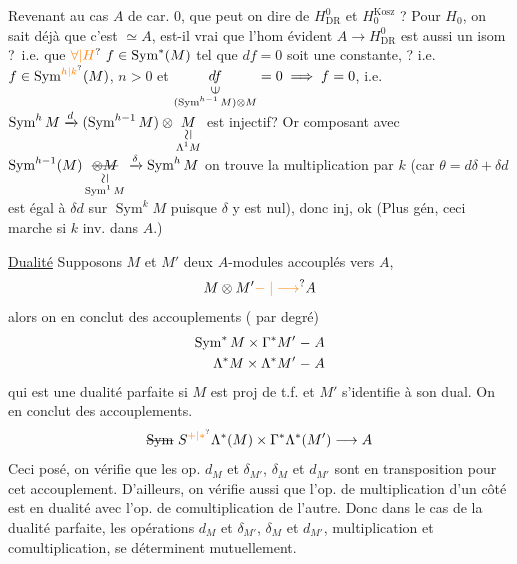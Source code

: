 Revenant au cas $A$ de car. 0, que peut on dire de $H^0_{\mathrm{DR}}$ et $H^{\mathrm{Kosz}}_0$ ? Pour $H_0$, on sait déjà que c'est $\simeq A$, est-il vrai que l'hom évident $A\longrightarrow H^0_{\mathrm{DR}}$ est aussi un isom ?\, i.e. que $\unsure{\forall|H}\ f\in\operatorname{Sym}^*(M)$ tel que $df=0$ soit  une constante, ? i.e.  $f\in\operatorname{Sym}^{\unsure{h|k}}(M)$, $n>0$ et $\underset{\substack{\rotatebox{90}{$\in$}\\(\operatorname{Sym}^{h-1}M)\otimes M}}{df}=0\implies f=0$, i.e. $\operatorname{Sym}^hM\xrightarrow{d}(\operatorname{Sym}^{h-1}M)\otimes\underset{\substack{\rotatebox{90}{$\simeq$}\\\Lambda^1M}}{M}$ est injectif?
Or composant avec $\operatorname{Sym}^{h-1}(M)\,\underset{\substack{\rotatebox{90}{$\simeq$}\\\operatorname{Sym}^1M}}{\deleted{\otimes M}}\xrightarrow{\delta}\operatorname{Sym}^hM$ on trouve la multiplication par $k$ (car $\theta=d\delta+\delta d$ est égal à $\delta d$ sur $\operatorname{Sym}^k M$ puisque $\delta$ y est nul), donc inj, ok (Plus gén, ceci marche si $k$ inv. dans $A$.)

\uline{Dualité} Supposons $M$ et $M'$ deux $A$-modules accouplés vers $A$,
\[
 M\otimes M'\unsure{\relbar|\longrightarrow} A
\]
alors on en conclut des accouplements ( par degré)
\[
 \begin{aligned}
 \operatorname{Sym}^* M\times\Gamma^*M'&\relbar A\\
 \Lambda^*M\times\Lambda^*M'&\relbar A
 \end{aligned}
\]
qui est une dualité parfaite si $M$ est proj de t.f. et $M'$ s'identifie à son dual. On en conclut des accouplements.
\[
 \deleted{\operatorname{Sym}}\ S^{\unsure{+|*}}\Lambda^*(M)\times\Gamma^*\Lambda^*(M')\longrightarrow A
\]
Ceci posé, on vérifie que les op. $d_M$ et $\delta_{M'}$, $\delta_M$ et $d_{M'}$ sont  en transposition pour cet accouplement.
D'ailleurs, on vérifie aussi que l'op. de multiplication d'un côté est en dualité avec l'op. de comultiplication de l'autre. Donc dans le cas de la dualité parfaite, les opérations $d_M$ et $\delta_{M'}$, $\delta_M$ et $d_{M'}$, multiplication et comultiplication, se déterminent mutuellement.


